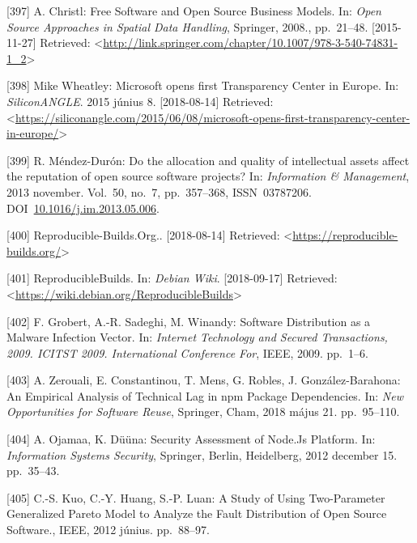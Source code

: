 \documentclass[12pt,magyar,a4paper,oneside]{scrreprt}
\begin{document}
\leavevmode\hypertarget{ref-christl_free_2008}{}%
{[}397{]} A. Christl: Free Software and Open Source Business Models. In:
\emph{Open Source Approaches in Spatial Data Handling}, Springer, 2008.,
pp.~21--48. {[}2015-11-27{]} Retrieved:
\textless{}\url{http://link.springer.com/chapter/10.1007/978-3-540-74831-1_2}\textgreater{}

\leavevmode\hypertarget{ref-mike_wheatley_microsoft_2015}{}%
{[}398{]} Mike Wheatley: Microsoft opens first Transparency Center in
Europe. In: \emph{SiliconANGLE}. 2015 június 8. {[}2018-08-14{]}
Retrieved:
\textless{}\url{https://siliconangle.com/2015/06/08/microsoft-opens-first-transparency-center-in-europe/}\textgreater{}

\leavevmode\hypertarget{ref-mendez-duron_allocation_2013}{}%
{[}399{]} R. Méndez-Durón: Do the allocation and quality of intellectual
assets affect the reputation of open source software projects? In:
\emph{Information \& Management}, 2013 november. Vol.~50, no.~7,
pp.~357--368, ISSN~03787206.
DOI~\href{https://doi.org/10.1016/j.im.2013.05.006}{10.1016/j.im.2013.05.006}.

\leavevmode\hypertarget{ref-noauthor_reproducible-builds.org_nodate}{}%
{[}400{]} Reproducible-Builds.Org.. {[}2018-08-14{]} Retrieved:
\textless{}\url{https://reproducible-builds.org/}\textgreater{}

\leavevmode\hypertarget{ref-noauthor_reproduciblebuilds_nodate}{}%
{[}401{]} ReproducibleBuilds. In: \emph{Debian Wiki}. {[}2018-09-17{]}
Retrieved:
\textless{}\url{https://wiki.debian.org/ReproducibleBuilds}\textgreater{}

\leavevmode\hypertarget{ref-grobert_software_2009}{}%
{[}402{]} F. Grobert, A.-R. Sadeghi, M. Winandy: Software Distribution
as a Malware Infection Vector. In: \emph{Internet Technology and Secured
Transactions, 2009. ICITST 2009. International Conference For}, IEEE,
2009. pp.~1--6.

\leavevmode\hypertarget{ref-zerouali_empirical_2018}{}%
{[}403{]} A. Zerouali, E. Constantinou, T. Mens, G. Robles, J.
González-Barahona: An Empirical Analysis of Technical Lag in npm Package
Dependencies. In: \emph{New Opportunities for Software Reuse}, Springer,
Cham, 2018 május 21. pp.~95--110.

\leavevmode\hypertarget{ref-ojamaa_security_2012}{}%
{[}404{]} A. Ojamaa, K. Düüna: Security Assessment of Node.Js Platform.
In: \emph{Information Systems Security}, Springer, Berlin, Heidelberg,
2012 december 15. pp.~35--43.

\leavevmode\hypertarget{ref-kuo_study_2012}{}%
{[}405{]} C.-S. Kuo, C.-Y. Huang, S.-P. Luan: A Study of Using
Two-Parameter Generalized Pareto Model to Analyze the Fault Distribution
of Open Source Software., IEEE, 2012 június. pp.~88--97.
\end{document}
